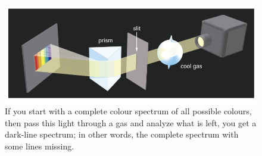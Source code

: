 \begin{figure}[ht!]
    \centering
    \includegraphics[width=0.9 \textwidth]{../figures/dark-line-spectrum.png}
    \caption{If you start with a complete colour spectrum of all possible colours, then pass this
            light through a gas and analyze what is left, you get a dark-line spectrum; in other words,
            the complete spectrum with some lines missing.}
    \label{fig:dark-line-spectrum}
\end{figure}

